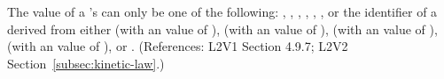 The value of a \KineticLaw's  can only be one of the
following: , , , ,
, , or the identifier of a \UnitDefinition
derived from either  (with an  value of ),
 (with an  value of ),  (with an
 value of ),  (with an
 value of ), or .  (References:
L2V1 Section 4.9.7; L2V2 Section~\ref{subsec:kinetic-law}.)
